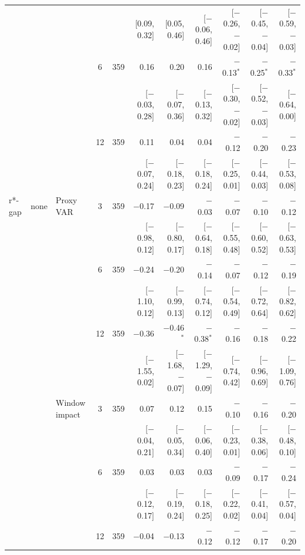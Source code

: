 \begin{longtable}{lllcrrrrrrr}
 & & & & & {\tiny [0.09, 0.32]} & {\tiny [0.05, 0.46]} & {\tiny [$-$0.06, 0.46]} & {\tiny [$-$0.26, $-$0.02]} & {\tiny [$-$0.45, $-$0.04]} & {\tiny [$-$0.59, $-$0.03]}\\
 &  &  & 6 & 359 & 0.16 & 0.20 & 0.16 & $-$0.13$^{*}$ & $-$0.25$^{*}$ & $-$0.33$^{*}$\\
 & & & & & {\tiny [$-$0.03, 0.28]} & {\tiny [$-$0.07, 0.36]} & {\tiny [$-$0.13, 0.32]} & {\tiny [$-$0.30, $-$0.02]} & {\tiny [$-$0.52, $-$0.03]} & {\tiny [$-$0.64, 0.00]}\\
 &  &  & 12 & 359 & 0.11 & 0.04 & 0.04 & $-$0.12 & $-$0.20 & $-$0.23\\
 & & & & & {\tiny [$-$0.07, 0.24]} & {\tiny [$-$0.18, 0.23]} & {\tiny [$-$0.18, 0.24]} & {\tiny [$-$0.25, 0.01]} & {\tiny [$-$0.44, 0.03]} & {\tiny [$-$0.53, 0.08]}\\
\addlinespace
r*-gap & none & Proxy VAR & 3 & 359 & $-$0.17 & $-$0.09 & $-$0.03 & $-$0.07 & $-$0.10 & $-$0.12\\
 & & & & & {\tiny [$-$0.98, 0.12]} & {\tiny [$-$0.80, 0.17]} & {\tiny [$-$0.64, 0.18]} & {\tiny [$-$0.55, 0.48]} & {\tiny [$-$0.60, 0.52]} & {\tiny [$-$0.63, 0.53]}\\
 &  &  & 6 & 359 & $-$0.24 & $-$0.20 & $-$0.14 & $-$0.07 & $-$0.12 & $-$0.19\\
 & & & & & {\tiny [$-$1.10, 0.12]} & {\tiny [$-$0.99, 0.13]} & {\tiny [$-$0.74, 0.12]} & {\tiny [$-$0.54, 0.49]} & {\tiny [$-$0.72, 0.64]} & {\tiny [$-$0.82, 0.62]}\\
 &  &  & 12 & 359 & $-$0.36 & $-$0.46$^{*}$ & $-$0.38$^{*}$ & $-$0.16 & $-$0.18 & $-$0.22\\
 & & & & & {\tiny [$-$1.55, 0.02]} & {\tiny [$-$1.68, $-$0.07]} & {\tiny [$-$1.29, $-$0.09]} & {\tiny [$-$0.74, 0.42]} & {\tiny [$-$0.96, 0.69]} & {\tiny [$-$1.09, 0.76]}\\
 &  & Window impact & 3 & 359 & 0.07 & 0.12 & 0.15 & $-$0.10 & $-$0.16 & $-$0.20\\
 & & & & & {\tiny [$-$0.04, 0.21]} & {\tiny [$-$0.05, 0.34]} & {\tiny [$-$0.06, 0.40]} & {\tiny [$-$0.23, 0.01]} & {\tiny [$-$0.38, 0.06]} & {\tiny [$-$0.48, 0.10]}\\
 &  &  & 6 & 359 & 0.03 & 0.03 & 0.03 & $-$0.09 & $-$0.17 & $-$0.24\\
 & & & & & {\tiny [$-$0.12, 0.17]} & {\tiny [$-$0.19, 0.24]} & {\tiny [$-$0.18, 0.25]} & {\tiny [$-$0.22, 0.02]} & {\tiny [$-$0.41, 0.04]} & {\tiny [$-$0.57, 0.04]}\\
 &  &  & 12 & 359 & $-$0.04 & $-$0.13 & $-$0.12 & $-$0.12 & $-$0.17 & $-$0.20\\

\end{longtable}
